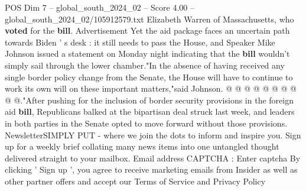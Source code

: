 \begin{textsample}{POS Dim 7 – global\_south\_2024\_02 – Score 4.00 – global\_south\_2024\_02/105912579.txt}
Elizabeth Warren of Massachusetts, who \textbf{voted} for the \textbf{bill}.
Advertisement Yet the aid package faces an uncertain path towards Biden ' s desk : it still needs to pass the House, and Speaker Mike Johnson issued a statement on Monday night indicating that the \textbf{bill} wouldn't simply sail through the lower chamber."In the absence of having received any single border policy change from the Senate, the House will have to continue to work its own will on these important matters,"said Johnson. @ @ @ @ @ @ @ @ @ @."After pushing for the inclusion of border security provisions in the foreign aid \textbf{bill}, Republicans balked at the bipartisan deal struck last week, and leaders in both parties in the Senate opted to move forward without those provisions.
NewsletterSIMPLY PUT - where we join the dots to inform and inspire you.
Sign up for a weekly brief collating many news items into one untangled thought delivered straight to your mailbox.
Email address CAPTCHA : Enter captcha By clicking ' Sign up ', you agree to receive marketing emails from Insider as well as other partner offers and accept our Terms of Service and Privacy Policy

\end{textsample}
